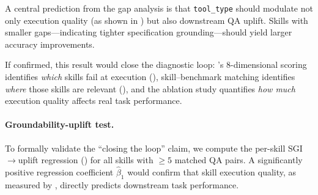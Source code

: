 A central prediction from the \rbu gap analysis is that \texttt{tool\_type} should modulate not only execution quality (as shown in ) but also downstream QA uplift.
Skills with smaller \rbu gaps---indicating tighter specification grounding---should yield larger accuracy improvements.

\begin{table}[t]
\centering\small
\caption{Skill-augmented uplift stratified by \texttt{tool\_type}. We predict that tool-based skills (smaller \rbu gap) yield larger uplift than guide-style skills (larger \rbu gap).}
\setlength{\tabcolsep}{3pt}
\label{tab:uplift_tool_type}
\end{table}


If confirmed, this result would close the diagnostic loop: \medskillbench's 8-dimensional scoring identifies \emph{which} skills fail at execution (), skill--benchmark matching identifies \emph{where} those skills are relevant (), and the ablation study quantifies \emph{how much} execution quality affects real task performance.

\paragraph{Groundability-uplift test.}
To formally validate the ``closing the loop'' claim, we compute the per-skill SGI$\to$uplift regression () for all skills with $\geq 5$ matched QA pairs.
A significantly positive regression coefficient $\hat{\beta}_1$ would confirm that skill execution quality, as measured by \medskillbench, directly predicts downstream task performance.

